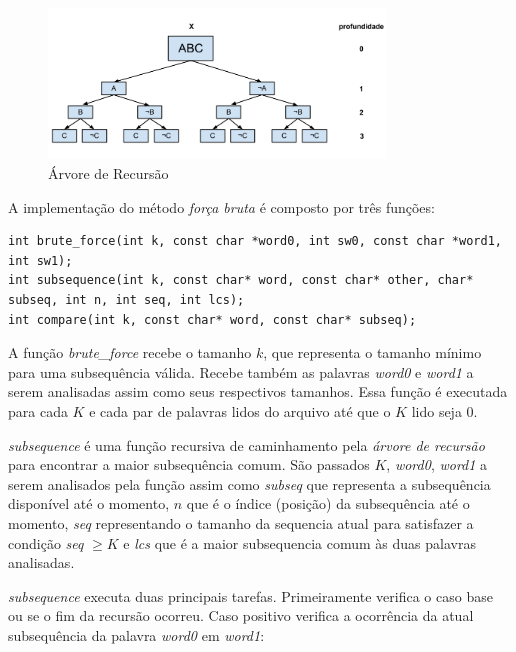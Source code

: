\begin{figure}[H]
    \begin{center}
        \includegraphics[width=0.8\textwidth,natwidth=610,natheight=642]{doc/recursion-tree.png}
        \caption{Árvore de Recursão}
        \label{fig:recursiontree}
    \end{center}
\end{figure}

A implementação do método \emph{força bruta} é composto por três funções:

\begin{lstlisting}
int brute_force(int k, const char *word0, int sw0, const char *word1, int sw1);
int subsequence(int k, const char* word, const char* other, char* subseq, int n, int seq, int lcs);
int compare(int k, const char* word, const char* subseq);
\end{lstlisting}

A função {\it brute\_force} recebe o tamanho $k$, que representa o 
tamanho mínimo para uma subsequência válida. Recebe também as 
palavras {\it word0} e {\it word1} a serem analisadas assim 
como seus respectivos tamanhos. Essa função é executada para cada $K$
e cada par de palavras lidos do arquivo até que o $K$ lido seja $0$.

{\it subsequence} é uma função recursiva de caminhamento pela 
\emph{árvore de recursão} para encontrar a maior subsequência comum.
São passados $K$, \emph{word0}, \emph{word1} a serem analisados pela
função assim como \emph{subseq} que representa a subsequência 
disponível até o momento, $n$ que é o índice (posição) da subsequência
até o momento, \emph{seq} representando o tamanho da sequencia atual 
para satisfazer a condição \emph{seq} $\ge K$ e \emph{lcs} que é 
a maior subsequencia comum às duas palavras analisadas. 

{\it subsequence} executa duas principais tarefas. Primeiramente 
verifica o caso base ou se o fim da recursão ocorreu. Caso positivo
verifica a ocorrência da atual subsequência da palavra \emph{word0} 
em \emph{word1}:

